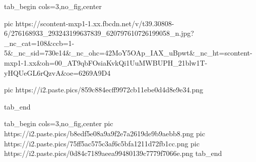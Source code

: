  
 
 
 
 


\ifcmt
  tab_begin cols=3,no_fig,center

     pic https://scontent-mxp1-1.xx.fbcdn.net/v/t39.30808-6/276168933_293243199637839_620797610726199058_n.jpg?_nc_cat=108&ccb=1-5&_nc_sid=730e14&_nc_ohc=42MoY5OAp_IAX_uBpwt&_nc_ht=scontent-mxp1-1.xx&oh=00_AT9qbFOsiaKvkQi1UuMWBUPH_21blw1T-yHQUeGL6rQzvA&oe=6269A9D4

		 pic https://i2.paste.pics/859c884ecff9972cb11ebe0d4d8e9e34.png

  tab_end
\fi

\ifcmt
  tab_begin cols=3,no_fig,center
     pic https://i2.paste.pics/b8edf5e08a9a9f2e7a2619de9b9aebb8.png
		 pic https://i2.paste.pics/75ff5ac575c3af6c5bfa1211d72fb1cc.png
		 pic https://i2.paste.pics/0d84c7189aeea99480139c7779f7066e.png
  tab_end
\fi
